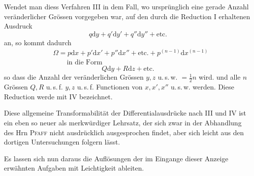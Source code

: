 Wendet man diess Verfahren III in dem Fall, wo ursprünglich eine gerade
Anzahl veränderlicher Grössen vorgegeben war, auf den durch die Reduction I
erhaltenen Ausdruck
\[
q\mathrm{d}y+q'\mathrm{d}y'+q''\mathrm{d}y''+\mathrm{etc.}
\]
an, so kommt dadurch
\[
\begin{aligned}&\Omega=p\mathrm{d}x+p'\mathrm{d}x'+p''\mathrm{d}x''+\mathrm{etc.}
+p^{(n-1)}\mathrm{d}x^{(n-1)}\\&\qquad\text{in die Form}\end{aligned}
\]
\[
Q\mathrm{d}y+R\mathrm{d}z+\mathrm{etc.}
\]
so dass die Anzahl der veränderlichen Grössen $y,z$ u.\,s.\,w. $=\frac12 n$ wird. und alle
$n$ Grössen $Q,R$ u.\,s.\,f. $y,z$ u.\,s.\,f. Functionen von $x,x',x''$ u.\,s.\,w. werden.
Diese Reduction werde mit IV bezeichnet.

Diese allgemeine Transformabilität der Differentialausdrücke nach III und
IV ist ein eben so neuer als merkwürdiger Lehrsatz, der sich zwar in der Abhandlung des Hrn \textsc{Pfaff} nicht ausdrücklich ausgesprochen findet, aber sich leicht
aus den dortigen Untersuchungen folgern lässt.

Es lassen sich nun daraus die Auflösungen der im Eingange dieser Anzeige
erwähnten Aufgaben mit Leichtigkeit ableiten.

